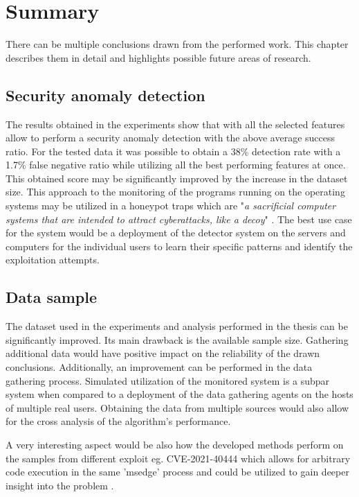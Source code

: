 \documentclass[a4paper,twoside,12pt]{book}
\begin{document}
\chapter{Summary}

There can be multiple conclusions drawn from the performed work. This chapter describes them in 
detail and highlights possible future areas of research.

\section{Security anomaly detection}

The results obtained in the experiments show that with all the selected features allow 
to perform a security anomaly detection with the above average success ratio. For the tested
data it was possible to obtain a 38\% detection rate with a 1.7\% false negative ratio while
utilizing all the best performing features at once. This obtained score may be significantly 
improved by the increase in the dataset size. This approach to the monitoring of the programs 
running on the operating systems may be utilized in a honeypot traps which are "\textit{a sacrificial 
computer systems that are intended to attract cyberattacks, like a decoy}" \cite{bib:Honeypot}. 
The best use case for the system would be a deployment of the detector system on the servers and 
computers for the individual users to learn their specific patterns and identify the exploitation
attempts.

\section{Data sample}

The dataset used in the experiments and analysis performed in the thesis can be significantly 
improved. Its main drawback is the available sample size. Gathering additional data would have
positive impact on the reliability of the drawn conclusions. Additionally, an improvement 
can be performed in the data gathering process. Simulated utilization of the monitored system
is a subpar system when compared to a deployment of the data gathering agents on the hosts of 
multiple real users. Obtaining the data from multiple sources would also allow for the cross
analysis of the algorithm's performance. 

A very interesting aspect would be also how the developed methods perform on the samples from 
different exploit eg. CVE-2021-40444 which allows for arbitrary code execution in the same 'msedge'
process and could be utilized to gain deeper insight into the problem \cite{bib:newEdgeExploit}.
\end{document}
